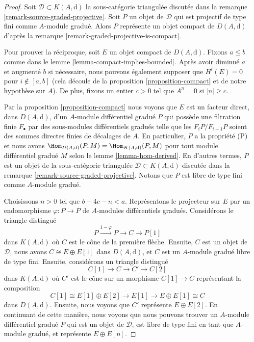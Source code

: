 \begin{proof}
Soit $\mathcal{D} \subset K(A, \text{d})$ la sous-catégorie triangulée
discutée dans la remarque \ref{remark-source-graded-projective}.
Soit $P$ un objet de $\mathcal{D}$ qui est projectif de type fini comme
$A$-module gradué. Alors $P$ représente un objet compact de $D(A,
\text{d})$ d'après la remarque \ref{remark-graded-projective-is-compact}.

\medskip\noindent
Pour prouver la réciproque, soit $E$ un objet compact de $D(A, \text{d})$.
Fixons $a \leq b$ comme dans le lemme
\ref{lemma-compact-implies-bounded}. Après avoir diminué $a$ et augmenté $b$ si nécessaire, nous pouvons
également supposer que $H^i(E) = 0$ pour $i \not \in [a, b]$ (cela
découle de la proposition \ref{proposition-compact} et de notre hypothèse sur
$A$). De plus, fixons un entier $c > 0$ tel que $A^n = 0$ si $|n| \geq c$.

\medskip\noindent
Par la proposition \ref{proposition-compact} nous voyons que $E$ est un
facteur direct, dans $D(A, \text{d})$, d'un $A$-module différentiel gradué $P$ qui
possède une filtration finie $F_\bullet$ par des sous-modules
différentiels gradués telle que les $F_iP/F_{i - 1}P$ soient des sommes directes
finies de décalages de $A$. En particulier, $P$ a la propriété (P) et nous
avons $\Hom_{D(A, \text{d})}(P, M) = \Hom_{K(A, \text{d})}(P, M)$ pour tout
module différentiel gradué $M$ selon le lemme \ref{lemma-hom-derived}. En
d'autres termes, $P$ est un objet de la sous-catégorie
triangulée $\mathcal{D} \subset K(A, \text{d})$ discutée dans la remarque
\ref{remark-source-graded-projective}. Notons que
$P$ est libre de type fini comme $A$-module gradué.

\medskip\noindent
Choisissons $n > 0$ tel que $b + 4c - n <
a$. Représentons le projecteur sur $E$ par un endomorphisme $\varphi : P \to P$
de $A$-modules différentiels gradués. Considérons le triangle distingué
$$
P \xrightarrow{1 - \varphi} P \to C \to P[1]
$$
dans $K(A, \text{d})$ où $C$ est le cône de la première flèche. Ensuite,
$C$ est un objet de $\mathcal{D}$, nous
avons $C \cong E \oplus E[1]$ dans $D(A, \text{d})$, et $C$
est un $A$-module gradué libre de type fini.
Ensuite, considérons un triangle distingué
$$
C[1] \to C \to C' \to C[2]
$$
dans $K(A, \text{d})$ où $C'$ est le cône sur un morphisme $C[1] \to
C$ représentant la composition
$$
C[1] \cong E[1] \oplus E[2] \to E[1] \to E \oplus E[1] \cong C
$$
dans $D(A, \text{d})$. Ensuite, nous voyons que $C'$ représente $E \oplus E[2]$.
En continuant de cette manière, nous voyons que nous pouvons trouver un
$A$-module différentiel gradué $P$ qui est un objet de $\mathcal{D}$,
est libre de type fini en tant que $A$-module gradué, et représente $E \oplus E[n]$.


\end{proof}
